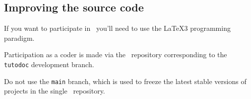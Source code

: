 \documentclass{tutodoc}
\begin{document}

\subsection{Improving the source code}

\begin{tdocimp}
    If you want to participate in \thisproj\, you'll need to use the \LaTeX3 programming paradigm.
\end{tdocimp}


Participation as a coder is made via the \thisrepo\ repository corresponding to the \verb#tutodoc# development branch.

\begin{tdoccaut}
Do not use the \verb#main# branch, which is used to freeze the latest stable versions of projects in the single \thismonorepo\ repository.
\end{tdoccaut}
\end{document}
